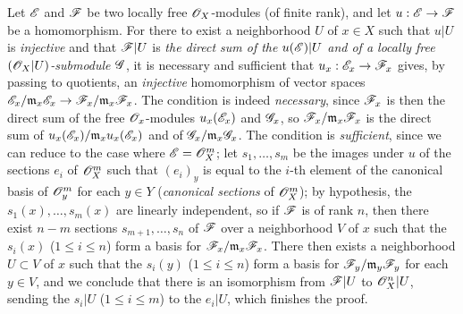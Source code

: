 \begin{env}[5.5.5]
\label{0.5.5.5}
Let $\mathscr{E}$ and $\mathscr{F}$ be two locally free $\mathscr{O}_X$-modules (of finite rank), and let $u:\sh{E}\to\sh{F}$ be a homomorphism.
For there to exist a neighborhood $U$ of $x\in X$ such that $u|U$ is \emph{injective} and that $\mathscr{F}|U$ is \emph{the direct sum of the $u(\mathscr{E})|U$ and of a locally free $(\mathscr{O}_X|U)$-submodule $\mathscr{G}$}, it is necessary and sufficient that $u_x:\sh{E}_x\to\sh{F}_x$ gives, by passing to quotients, an \emph{injective} homomorphism of vector spaces $\sh{E}_x/\fk{m}_x\sh{E}_x\to\sh{F}_x/\fk{m}_x\sh{F}_x$.
The condition is indeed \emph{necessary}, since $\mathscr{F}_x$ is then the direct sum of the free $\mathscr{O}_x$-modules $u_x(\mathscr{E}_x)$ and $\mathscr{G}_x$, so $\mathscr{F}_x/\mathfrak{m}_x\mathscr{F}_x$ is the direct sum of $u_x(\mathscr{E}_x)/\mathfrak{m}_x u_x(\mathscr{E}_x)$ and of $\mathscr{G}_x/\mathfrak{m}_x\mathscr{G}_x$.
The condition is \emph{sufficient}, since we can reduce to the case where $\mathscr{E}=\mathscr{O}_X^m$;
let $s_1,\dots,s_m$ be the images under $u$ of the sections $e_i$ of $\mathscr{O}_X^m$ such that $(e_i)_y$ is equal to the $i$-th element of the canonical basis of $\mathscr{O}_y^m$ for each $y\in Y$ (\emph{canonical sections} of $\mathscr{O}_X^m$);
by hypothesis, the $s_1(x),\dots,s_m(x)$ are linearly independent, so if $\mathscr{F}$ is of rank $n$, then there exist $n-m$ sections $s_{m+1},\dots,s_n$ of $\mathscr{F}$ over a neighborhood $V$ of $x$ such that the $s_i(x)$ ($1\leqslant i\leqslant n$) form a basis for $\mathscr{F}_x/\mathfrak{m}_x\mathscr{F}_x$.
There then exists  a neighborhood $U\subset V$ of $x$ such that the $s_i(y)$ ($1\leqslant i\leqslant n$) form a basis for $\mathscr{F}_y/\mathfrak{m}_y\mathscr{F}_y$ for each $y\in V$, and we conclude  that there is an isomorphism from $\mathscr{F}|U$ to $\mathscr{O}_X^n|U$, sending the $s_i|U$ ($1\leqslant i\leqslant m$) to the $e_i|U$, which finishes the proof.
\end{env}
